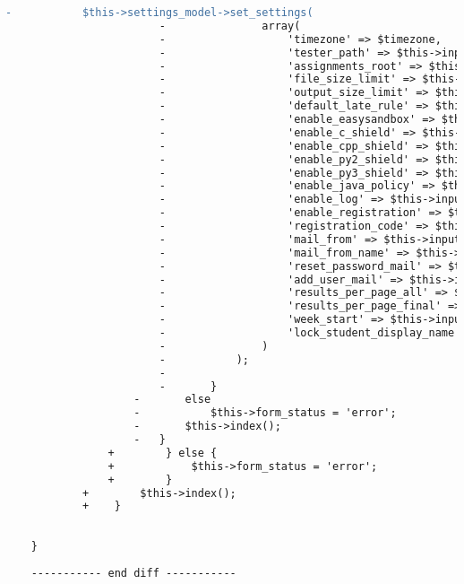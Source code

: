 \begin{lstlisting}[language=diff, caption=Perubahan pada kode Settings.php]
						-			$this->settings_model->set_settings(
						-				array(
						-					'timezone' => $timezone,
						-					'tester_path' => $this->input->post('tester_path'),
						-					'assignments_root' => $this->input->post('assignments_root'),
						-					'file_size_limit' => $this->input->post('file_size_limit'),
						-					'output_size_limit' => $this->input->post('output_size_limit'),
						-					'default_late_rule' => $this->input->post('default_late_rule'),
						-					'enable_easysandbox' => $this->input->post('enable_easysandbox')===NULL?0:1,
						-					'enable_c_shield' => $this->input->post('enable_c_shield')===NULL?0:1,
						-					'enable_cpp_shield' => $this->input->post('enable_cpp_shield')===NULL?0:1,
						-					'enable_py2_shield' => $this->input->post('enable_py2_shield')===NULL?0:1,
						-					'enable_py3_shield' => $this->input->post('enable_py3_shield')===NULL?0:1,
						-					'enable_java_policy' => $this->input->post('enable_java_policy')===NULL?0:1,
						-					'enable_log' => $this->input->post('enable_log')===NULL?0:1,
						-					'enable_registration' => $this->input->post('enable_registration')===NULL?0:1,
						-					'registration_code' => $this->input->post('registration_code'),
						-					'mail_from' => $this->input->post('mail_from'),
						-					'mail_from_name' => $this->input->post('mail_from_name'),
						-					'reset_password_mail' => $this->input->post('reset_password_mail'),
						-					'add_user_mail' => $this->input->post('add_user_mail'),
						-					'results_per_page_all' => $this->input->post('rpp_all'),
						-					'results_per_page_final' => $this->input->post('rpp_final'),
						-					'week_start' => $this->input->post('week_start'),
						-					'lock_student_display_name' => $this->input->post('lock_student_display_name')===NULL?0:1,
						-				)
						-			);
						-
						-		}
					-		else
					-			$this->form_status = 'error';
					-		$this->index();
					-	}
				+        } else {
				+            $this->form_status = 'error';
				+        }
			+        $this->index();
			+    }
		
		
	}
	
	----------- end diff -----------
\end{lstlisting}

